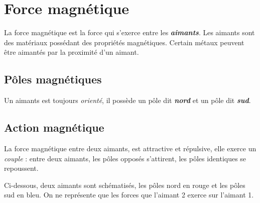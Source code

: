 
\section{Force magnétique}
%

La force magnétique est la force qui s'exerce entre les \textbf{\textit {aimants}}.
Les aimants sont des matériaux possédant des propriétés magnétiques.
Certain métaux peuvent être aimantés par la proximité d'un aimant.

\subsection{Pôles magnétiques}

Un aimants est toujours {\it orienté}, il possède un pôle dit \textbf{\textit {nord}} et un pôle
dit \textbf{\textit {sud}}.


\subsection{Action magnétique}

La force magnétique entre deux aimants, est attractive et répulsive, elle exerce un {\it couple} :
entre deux aimants, les pôles opposés s'attirent, les pôles identiques se repoussent. 

Ci-dessous, deux aimants sont schématisés, les pôles nord en rouge et les pôles sud en bleu. On ne représente que les forces que l'aimant 2 exerce sur l'aimant 1.

\begin{center}
\end{center}
